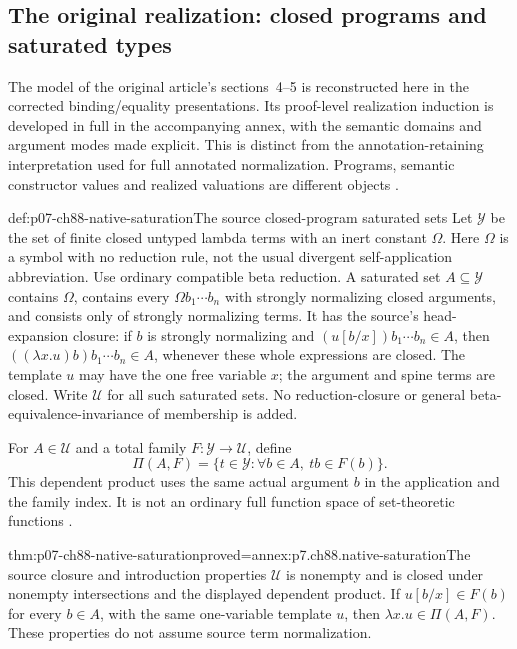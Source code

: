 \subsection{The original realization: closed programs and saturated types}
\label{sec:p07-ch88-realization}

The model of the original article's sections~4--5 is reconstructed here
in the corrected binding/equality presentations. Its proof-level
realization induction is developed in full in the accompanying annex,
with the semantic domains and argument modes made explicit. This is
distinct from the annotation-retaining interpretation used for full
annotated normalization. Programs, semantic constructor values and
realized valuations are different objects
\cite[pp.~105--110]{CoquandHuet1988}.

\begin{hbdefinition}{def:p07-ch88-native-saturation}{The source closed-program saturated sets}
Let \(\mathcal Y\) be the set of finite closed untyped lambda terms with
an inert constant \(\Omega\). Here \(\Omega\) is a symbol with no
reduction rule, not the usual divergent self-application abbreviation.
Use ordinary compatible beta reduction. A saturated set \(A\subseteq
\mathcal Y\) contains \(\Omega\), contains every
\(\Omega b_1\cdots b_n\) with strongly normalizing closed arguments,
and consists only of strongly normalizing terms. It has the source's
head-expansion closure: if \(b\) is strongly normalizing and
\((u[b/x])b_1\cdots b_n\in A\), then
\(((\lambda x.u)b)b_1\cdots b_n\in A\), whenever these whole
expressions are closed. The template \(u\) may have the one free variable
\(x\); the argument and spine terms are closed. Write \(\mathcal U\)
for all such saturated sets. No reduction-closure or general
beta-equivalence-invariance of membership is added.

For \(A\in\mathcal U\) and a total family \(F:\mathcal Y\to
\mathcal U\), define
\[
 \Pi(A,F)=\{t\in\mathcal Y:\forall b\in A,\ tb\in F(b)\}.
\]
This dependent product uses the same actual argument \(b\) in the
application and the family index. It is not an ordinary full function
space of set-theoretic functions \cite[p.~107]{CoquandHuet1988}.
\end{hbdefinition}

\begin{hblemma}{thm:p07-ch88-native-saturation}{proved=annex:p7.ch88.native-saturation}{The source closure and introduction properties}
\(\mathcal U\) is nonempty and is closed under nonempty intersections
and the displayed dependent product. If \(u[b/x]\in F(b)\) for
every \(b\in A\), with the same one-variable template \(u\), then
\(\lambda x.u\in\Pi(A,F)\). These properties do not assume source
term normalization.
\end{hblemma}

